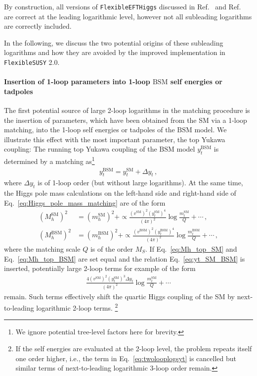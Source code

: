 \documentclass[final,3p,11pt,pdflatex]{elsarticle}
\makeatletter
\newcommand{\fs}{\texttt{FlexibleSUSY}\@\xspace}
\newcommand{\fstwo}{\fs 2.0\@\xspace}
\newcommand{\feft}{\texttt{Flex\-ib\-le\-EFT\-Higgs}\@\xspace}
\newcommand{\SM}{\ensuremath{\text{SM}}\xspace}
\newcommand{\BSM}{\ensuremath{\text{BSM}}\xspace}
\newcommand{\MS}{\ensuremath{M_S}\xspace}
\makeatother
\begin{document}
By construction, all versions of \feft discussed in
Ref.~\cite{Athron:2016fuq} and Ref.~\cite{Staub:2017jnp} are correct at the
leading logarithmic level, however not all subleading logarithms are correctly
included.
%

In the following, we discuss the two potential origins of these subleading
logarithms and how they are avoided by the improved  implementation in
\fstwo.

\paragraph{Insertion of 1-loop parameters into 1-loop \BSM self energies or
  tadpoles}

The first potential source of large 2-loop logarithms in the matching
procedure is the insertion of parameters, which have been obtained from the SM
via a 1-loop matching, into the 1-loop self energies or tadpoles of the \BSM
model.  We illustrate this effect with the most important parameter, the top
Yukawa coupling:
The running top Yukawa coupling of the \BSM model  $y_t^\BSM$ is
determined by a matching as\footnote{We ignore potential tree-level
  factors here for brevity.}
%
\begin{align}
  y_t^\BSM = y_t^\SM + \Delta y_t \,, \label{eq:yt_SM_BSM}
\end{align}
%
where $\Delta y_t$ is of 1-loop order (but without large logarithms).
At the same time, the Higgs pole mass calculations on the left-hand side and
right-hand side of Eq.~\eqref{eq:Higgs_pole_mass_matching} are of the form
%
\begin{align}
  (M_h^\SM)^2 &= (m_h^\SM)^2 + \propto \frac{(v^\SM)^2(y_t^\SM)^4}{(4\pi)^2} \log\frac{m_t^\SM}{Q} + \cdots \,,
  \label{eq:Mh_top_SM}\\
  (M_h^\BSM)^2 &= (m_h^\BSM)^2 + \propto \frac{(v^\BSM)^2(y_t^\BSM)^4}{(4\pi)^2} \log\frac{m_t^\BSM}{Q} + \cdots \,,
  \label{eq:Mh_top_BSM}
\end{align}
%
where the matching scale $Q$ is of the order $\MS$.
If Eq.\ \eqref{eq:Mh_top_SM} and Eq.\ \eqref{eq:Mh_top_BSM} are set equal and
the relation Eq.\ \eqref{eq:yt_SM_BSM} is inserted, potentially
large 2-loop terms for example of the form
%
\begin{align}
  \frac{4(v^\SM)^2(y_t^\SM)^3 \Delta y_t}{(4\pi)^2} \log\frac{m_t^\SM}{Q} + \cdots
\label{eq:twolooplogsyt}
\end{align}
%
remain. Such terms effectively shift the quartic Higgs coupling of the
SM by  next-to-leading logarithmic 2-loop terms.%
\footnote{If the self energies are evaluated at the
  2-loop level, the problem repeats itself one order higher, i.e., the
  term in Eq.~\eqref{eq:twolooplogsyt} is cancelled but similar terms of
  next-to-leading logarithmic 3-loop order remain.}
\end{document}

